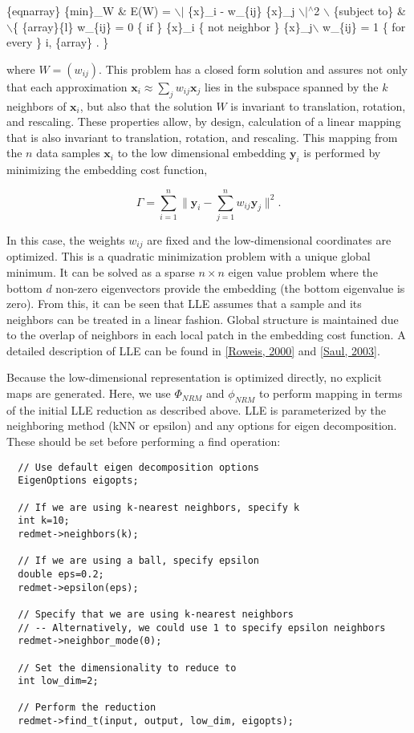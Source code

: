 \{eqnarray\} \{min\}\_\-W \& E(W) =  $\backslash$$|$ \{x\}\_\-i -  w\_\-\{ij\} \{x\}\_\-j $\backslash$$|$$^\wedge$2  $\backslash$ \{subject to\} \& $\backslash$\{ \{array\}\{l\} w\_\-\{ij\} = 0 \{ if \} \{x\}\_\-i \{ not neighbor \} \{x\}\_\-j$\backslash$  w\_\-\{ij\} = 1 \{ for every \} i, \{array\} . \}

where $W = (w_{ij})$. This problem has a closed form solution and assures not only that each approximation $\mathbf{x}_i \approx \sum_j w_{ij} \mathbf{x}_j$ lies in the subspace spanned by the $k$ neighbors of $\mathbf{x}_i$, but also that the solution $W$ is invariant to translation, rotation, and rescaling. These properties allow, by design, calculation of a linear mapping that is also invariant to translation, rotation, and rescaling. This mapping from the $n$ data samples $\mathbf{x}_i$ to the low dimensional embedding $\mathbf{y}_i$ is performed by minimizing the embedding cost function,

\[ \Gamma=\displaystyle\sum_{i=1}^n\|\mathbf{y}_i-\sum_{j=1}^n w_{ij}\mathbf{y}_j\|^2. \]

In this case, the weights $w_{ij}$ are fixed and the low-dimensional coordinates are optimized. This is a quadratic minimization problem with a unique global minimum. It can be solved as a sparse $n \times n$ eigen value problem where the bottom $d$ non-zero eigenvectors provide the embedding (the bottom eigenvalue is zero). From this, it can be seen that LLE assumes that a sample and its neighbors can be treated in a linear fashion. Global structure is maintained due to the overlap of neighbors in each local patch in the embedding cost function. A detailed description of LLE can be found in \hyperlink{index_ref}{\mbox{[}Roweis, 2000\mbox{]}} and \hyperlink{index_ref}{\mbox{[}Saul, 2003\mbox{]}}.

Because the low-dimensional representation is optimized directly, no explicit maps are generated. Here, we use $\Phi_{NRM}$ and $\phi_{NRM}$ to perform mapping in terms of the initial LLE reduction as described above. LLE is parameterized by the neighboring method (k\-NN or epsilon) and any options for eigen decomposition. These should be set before performing a find operation:



\footnotesize\begin{verbatim}  // Use default eigen decomposition options
  EigenOptions eigopts;

  // If we are using k-nearest neighbors, specify k
  int k=10;
  redmet->neighbors(k);
  
  // If we are using a ball, specify epsilon
  double eps=0.2;
  redmet->epsilon(eps);
  
  // Specify that we are using k-nearest neighbors
  // -- Alternatively, we could use 1 to specify epsilon neighbors
  redmet->neighbor_mode(0);

  // Set the dimensionality to reduce to
  int low_dim=2;
  
  // Perform the reduction
  redmet->find_t(input, output, low_dim, eigopts);
\end{verbatim}
\normalsize


